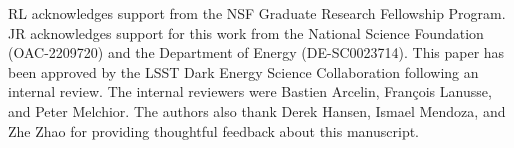 RL acknowledges support from the NSF Graduate Research Fellowship Program.
JR acknowledges support for this work from the National Science Foundation (OAC-2209720) and the Department of Energy (DE-SC0023714).
This paper has been approved by the LSST Dark Energy Science Collaboration following an internal review. 
The internal reviewers were Bastien Arcelin, Fran\c{c}ois Lanusse, and Peter Melchior. 
The authors also thank Derek Hansen, Ismael Mendoza, and Zhe Zhao for providing thoughtful feedback about this manuscript.
